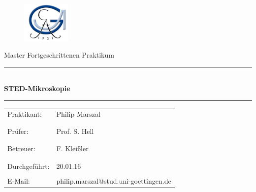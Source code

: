 \documentclass[a4paper, 12pt]{article}
\begin{document}
 \begin{titlepage}
 \begin{figure}[t]
 \includegraphics[height=2cm]{georg} \hfill
 \end{figure}

\normalsize
\vspace{1cm}

\begin{center}
\Large Master Fortgeschrittenen Praktikum \\ \vspace{1cm}
\hrule \vspace{3mm}
\large {} \\
\Huge{\bf STED-Mikroskopie}
\vspace{5mm}
\hrule
\end{center}

\normalsize


\begin{table}[!h]
\begin{center}

  \begin{tabular}{ll}
  Praktikant: &Philip Marszal\\
   &\\
   &\\
  Prüfer: & Prof. S. Hell\\
	&\\
	&\\
  Betreuer: & F. Kleißler\\
  &\\
  &\\
	  Durchgeführt: & 20.01.16\\

\vspace{1cm}& \\
  E-Mail: & \ttfamily philip.marszal@stud.uni-goettingen.de\\
\end{tabular}
\end{center}
\end{table}
\end{titlepage}
\newpage
\thispagestyle{empty}
\mbox{}
\thispagestyle{empty}
\newpage
\thispagestyle{empty}
\tableofcontents
\newpage

\pagestyle{fancy}
\setcounter{page}{1}
\end{document}
